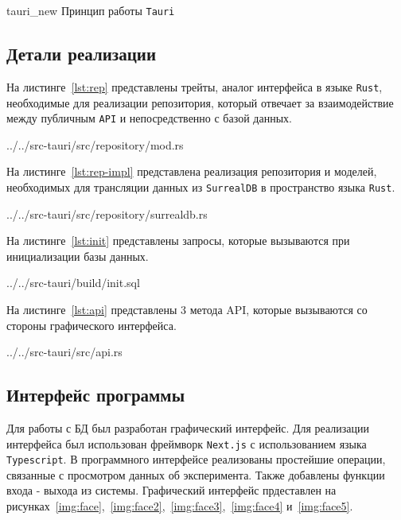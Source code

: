\img{100mm}
{tauri_new}
{Принцип работы \texttt{Tauri}}

\subsection{Детали реализации}
На листинге~\ref{lst:rep} представлены трейты, аналог интерфейса в языке \texttt{Rust}, необходимые для реализации репозитория, который отвечает за взаимодействие между публичным \texttt{API} и непосредственно с базой данных.

\begin{lstinputlisting}[
        caption={Трейты, необходимые для реализации репозитория.},
        label={lst:rep},
        language={rust},
        style={rustlang}
    ]{../../src-tauri/src/repository/mod.rs}
\end{lstinputlisting}

На листинге~\ref{lst:rep-impl} представлена реализация репозитория и моделей, необходимых для трансляции данных из \texttt{SurrealDB} в пространство языка \texttt{Rust}.
\begin{lstinputlisting}[
        caption={Реализация репозитория.},
        label={lst:rep-impl},
        style={rustlang},
        language={rust},
        linerange={81-225}
    ]{../../src-tauri/src/repository/surrealdb.rs}
\end{lstinputlisting}

На листинге~\ref{lst:init} представлены запросы, которые вызываются при инициализации базы данных.
\begin{lstinputlisting}[
        caption={Инициализация базы данных.},
        label={lst:init},
        language={rust},
        style={rustlang}
    ]{../../src-tauri/build/init.sql}
\end{lstinputlisting}

На листинге~\ref{lst:api} представлены 3 метода API, которые вызываются со стороны графического интерфейса.
\begin{lstinputlisting}[
        caption={Методы API.},
        label={lst:api},
        language={rust},
        style={rustlang},
        linerange={16-100}
    ]{../../src-tauri/src/api.rs}
\end{lstinputlisting}

\subsection{Интерфейс программы}
Для работы с БД был разработан графический интерфейс.
Для реализации интерфейса был использован фреймворк \texttt{Next.js} с использованием языка \texttt{Typescript}.
В программного интерфейсе реализованы простейшие операции, связанные с просмотром данных об эксперимента. 
Также добавлены функции входа - выхода из системы.
Графический интерфейс прдеставлен на рисунках~\ref{img:face},~\ref{img:face2},~\ref{img:face3},~\ref{img:face4} и~\ref{img:face5}.

